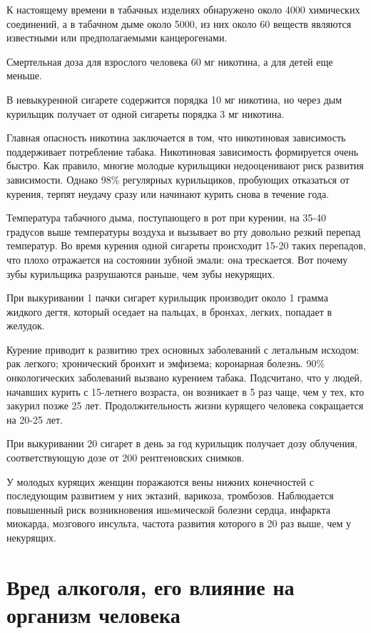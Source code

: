 К настоящему времени в табачных изделиях обнаружено около 4000 химических соединений, а в табачном дыме около 5000, из них около 60 веществ являются известными или предполагаемыми канцерогенами.

Смертельная доза для взрослого человека 60 мг никотина, а для детей еще меньше.

В невыкуренной сигарете содержится порядка 10 мг никотина, но через дым курильщик получает от одной сигареты порядка 3 мг никотина.

Главная опасность никотина заключается в том, что никотиновая зависимость поддерживает потребление табака. Никотиновая зависимость формируется очень быстро. Как правило, многие молодые курильщики недооценивают риск развития зависимости. Однако 98\% регулярных курильщиков, пробующих отказаться от курения, терпят неудачу сразу или начинают курить снова в течение года.

Температура табачного дыма, поступающего в рот при курении, на 35-40 градусов выше температуры воздуха и вызывает во рту довольно резкий перепад температур. Во время курения одной сигареты происходит 15-20 таких перепадов, что плохо отражается на состоянии зубной эмали: она трескается. Вот почему зубы курильщика разрушаются раньше, чем зубы некурящих.

При выкуривании 1 пачки сигарет курильщик производит около 1 грамма жидкого дегтя, который оседает на пальцах, в бронхах, легких, попадает в желудок.

Курение приводит к развитию трех основных заболеваний с летальным исходом: рак легкого; хронический бронхит и эмфизема; коронарная болезнь. 90\% онкологических заболеваний вызвано курением табака. Подсчитано, что у людей, начавших курить с 15-летнего возраста, он возникает в 5 раз чаще, чем у тех, кто закурил позже 25 лет. Продолжительность жизни курящего человека сокращается на 20-25 лет.

При выкуривании 20 сигарет в день за год курильщик получает дозу облучения, соответствующую дозе от 200 рентгеновских снимков.

У молодых курящих женщин поражаются вены нижних конечностей с последующим развитием у них эктазий, варикоза, тромбозов. Наблюдается повышенный риск возникновения ишeмической болезни сердца, инфаркта миокарда, мозгового инсульта, частота развития которого в 20 раз выше, чем у некурящих.


\section{Вред алкоголя, его влияние на организм человека }

